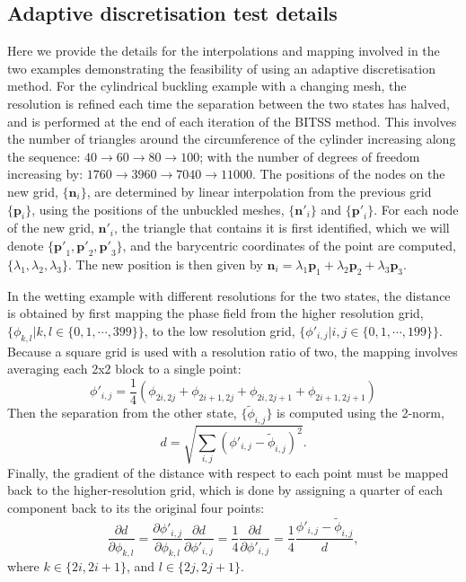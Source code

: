 \documentclass[twocolumn,10pt]{revtex4-2}
\begin{document}
\subsection{Adaptive discretisation test details}
Here we provide the details for the interpolations and mapping involved in the two examples demonstrating the feasibility of using an adaptive discretisation method.
For the cylindrical buckling example with a changing mesh, the resolution is refined each time the separation between the two states has halved, and is performed at the end of each iteration of the BITSS method. 
This involves the number of triangles around the circumference of the cylinder increasing along the sequence: $40 \rightarrow 60 \rightarrow 80 \rightarrow 100$; with the number of degrees of freedom increasing by: $1760 \rightarrow 3960 \rightarrow 7040 \rightarrow 11000$.
The positions of the nodes on the new grid, $\{\bm{n}_i\}$, are determined by linear interpolation from the previous grid $\{\bm{p}_i\}$, using the positions of the unbuckled meshes, $\{\bm{n'}_i\}$ and $\{\bm{p'}_i\}$.
For each node of the new grid, $\bm{n'}_i$, the triangle that contains it is first identified, which we will denote $\{\bm{p'}_1,\bm{p'}_2,\bm{p'}_3\}$, and the barycentric coordinates of the point are computed, $\{\lambda_1,\lambda_2,\lambda_3\}$.
The new position is then given by $\bm{n}_i = \lambda_1 \bm{p}_1 + \lambda_2 \bm{p}_2 + \lambda_3 \bm{p}_3$.

In the wetting example with different resolutions for the two states, the distance is obtained by first mapping the phase field from the higher resolution grid, $\{\phi_{k,l} | k,l \in \{0,1,\cdots,399\}\}$, to the low resolution grid, $\{\phi'_{i,j} | i,j \in \{0,1,\cdots,199\}\}$.
Because a square grid is used with a resolution ratio of two, the mapping involves averaging each 2x2 block to a single point:
\begin{equation}
  \phi'_{i,j} = \frac{1}{4} \left( \phi_{2i,2j} + \phi_{2i+1,2j} + \phi_{2i,2j+1} + \phi_{2i+1,2j+1} \right)
\end{equation}
Then the separation from the other state, $\{\widetilde{\phi}_{i,j}\}$ is computed using the 2-norm,
\begin{equation}
  d = \sqrt{\sum_{i,j} \left( \phi'_{i,j} - \widetilde{\phi}_{i,j} \right)^2}.
\end{equation}
Finally, the gradient of the distance with respect to each point must be mapped back to the higher-resolution grid, which is done by assigning a quarter of each component back to its the original four points:
\begin{equation}
  \frac{\partial d}{\partial \phi_{k,l}} =
    \frac{\partial \phi'_{i,j}}{\partial \phi_{k,l}} \frac{\partial d}{\partial \phi'_{i,j}} =
    \frac{1}{4} \frac{\partial d}{\partial \phi'_{i,j}} =
    \frac{1}{4} \frac{\phi'_{i,j} - \widetilde{\phi}_{i,j}}{d},
\end{equation}
where $k \in \{2i, 2i+1\}$, and $l \in \{2j, 2j+1\}$.
\end{document}
